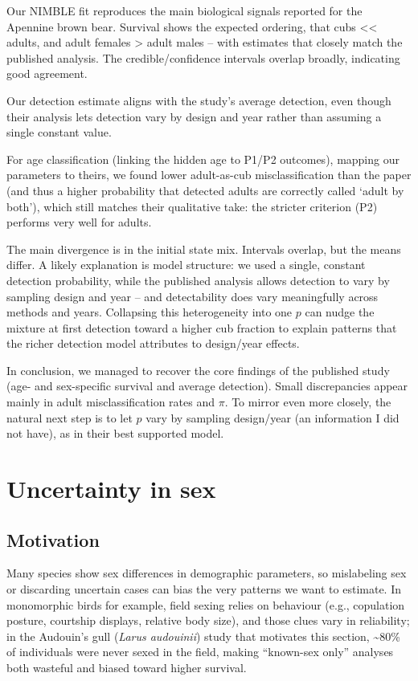 \documentclass[
  12pt,
]{krantz}
\begin{document}
Our NIMBLE fit reproduces the main biological signals reported for the Apennine brown bear. Survival shows the expected ordering, that cubs \textless\textless{} adults, and adult females \textgreater{} adult males -- with estimates that closely match the published analysis. The credible/confidence intervals overlap broadly, indicating good agreement.

Our detection estimate aligns with the study's average detection, even though their analysis lets detection vary by design and year rather than assuming a single constant value.

For age classification (linking the hidden age to P1/P2 outcomes), mapping our parameters to theirs, we found lower adult-as-cub misclassification than the paper (and thus a higher probability that detected adults are correctly called `adult by both'), which still matches their qualitative take: the stricter criterion (P2) performs very well for adults.

The main divergence is in the initial state mix. Intervals overlap, but the means differ. A likely explanation is model structure: we used a single, constant detection probability, while the published analysis allows detection to vary by sampling design and year -- and detectability does vary meaningfully across methods and years. Collapsing this heterogeneity into one \(p\) can nudge the mixture at first detection toward a higher cub fraction to explain patterns that the richer detection model attributes to design/year effects.

In conclusion, we managed to recover the core findings of the published study (age- and sex-specific survival and average detection). Small discrepancies appear mainly in adult misclassification rates and \(\pi\). To mirror \citet{Gervasi2017} even more closely, the natural next step is to let \(p\) vary by sampling design/year (an information I did not have), as in their best supported model.

\section{Uncertainty in sex}\label{uncertainty-in-sex}

\subsection{Motivation}\label{motivation-2}

Many species show sex differences in demographic parameters, so mislabeling sex or discarding uncertain cases can bias the very patterns we want to estimate. In monomorphic birds for example, field sexing relies on behaviour (e.g., copulation posture, courtship displays, relative body size), and those clues vary in reliability; in the Audouin's gull (\emph{Larus audouinii}) study that motivates this section, \textasciitilde80\% of individuals were never sexed in the field, making ``known-sex only'' analyses both wasteful and biased toward higher survival.
\end{document}
